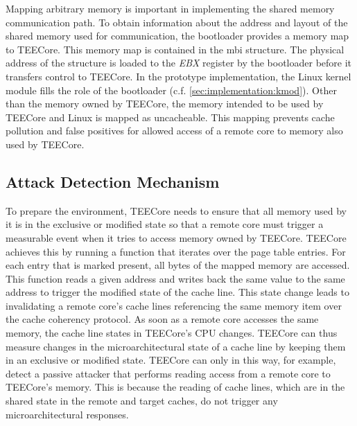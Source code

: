 Mapping arbitrary memory is important in implementing the shared memory
communication path. To obtain information about the address and layout of the
shared memory used for communication, the bootloader provides a memory map to
TEECore. This memory map is contained in the \gls{mbi} structure. The physical
address of the structure is loaded to the \textit{EBX} register by the
bootloader before it transfers control to TEECore. In the prototype
implementation, the Linux kernel module fills the role of the bootloader (c.f.
\ref{sec:implementation:kmod}). Other than the memory owned by TEECore, the
memory intended to be used by TEECore and Linux is mapped as uncacheable. This
mapping prevents cache pollution and false positives for allowed access of a
remote core to memory also used by TEECore.

\subsection{Attack Detection Mechanism}
\label{sec:implementation:teeKernel:pmcs}
To prepare the environment, TEECore needs to ensure that all memory used by it
is in the exclusive or modified state so that a remote core must trigger a
measurable event when it tries to access memory owned by TEECore. TEECore
achieves this by running a function that iterates over the page table entries.
For each entry that is marked present, all bytes of the mapped memory are
accessed. This function reads a given address and writes back the same value to
the same address to trigger the modified state of the cache line. This state
change leads to invalidating a remote core's cache lines referencing the same
memory item over the cache coherency protocol. As soon as a remote core accesses
the same memory, the cache line states in TEECore's CPU changes. TEECore can
thus measure changes in the microarchitectural state of a cache line by keeping
them in an exclusive or modified state. TEECore can only in this way, for
example, detect a passive attacker that performs reading access from a remote
core to TEECore's memory. This is because the reading of cache lines, which are
in the shared state in the remote and target caches, do not trigger any
microarchitectural responses.\\

